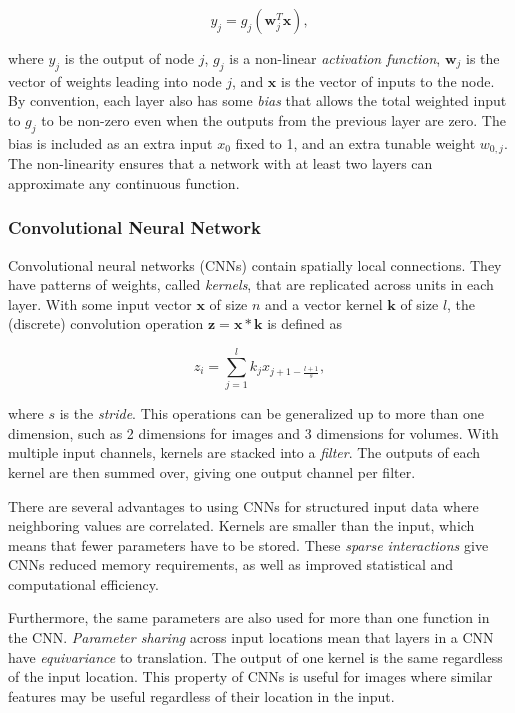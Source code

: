 \begin{equation}
    y_j = g_j(\mathbf{w}_j^T \mathbf{x}),
\end{equation}

where \(y_j\) is the output of node \(j\), \(g_j\) is a non-linear \textit{activation function}, \(\mathbf{w}_j\) is the vector of weights leading into node \(j\), and \(\mathbf{x}\) is the vector of inputs to the node.
By convention, each layer also has some \textit{bias} that allows the total weighted input to \(g_j\) to be non-zero even when the outputs from the previous layer are zero.
The bias is included as an extra input \(x_0\) fixed to 1, and an extra tunable weight \(w_{0,j}\).
The non-linearity ensures that a network with at least two layers can approximate any continuous function.~\cite{russell_artificial_2021}

\subsubsection{Convolutional Neural Network}

Convolutional neural networks (CNNs) contain spatially local connections.
They have patterns of weights, called \textit{kernels}, that are replicated across units in each layer.
With some input vector \(\mathbf{x}\) of size \(n\) and a vector kernel \(\mathbf{k}\) of size \(l\), the (discrete) convolution operation \(\mathbf{z} = \mathbf{x} \ast \mathbf{k}\) is defined as

\begin{equation}
    z_i = \sum_{j=1}^l k_j x_{j+1-\frac{l+1}{s}},
\end{equation}

where \(s\) is the \textit{stride}.
This operations can be generalized up to more than one dimension, such as 2 dimensions for images and 3 dimensions for volumes.
With multiple input channels, kernels are stacked into a \textit{filter}.
The outputs of each kernel are then summed over, giving one output channel per filter.

There are several advantages to using CNNs for structured input data where neighboring values are correlated.
Kernels are smaller than the input, which means that fewer parameters have to be stored.
These \textit{sparse interactions} give CNNs reduced memory requirements,
as well as improved statistical and computational efficiency.

Furthermore, the same parameters are also used for more than one function in the CNN. \textit{Parameter sharing} across input locations mean that layers in a CNN have \textit{equivariance} to translation. 
The output of one kernel is the same regardless of the input location.
This property of CNNs is useful for images where similar features may be useful regardless of their location in the input.~\cite{goodfellow_deep_2016}

